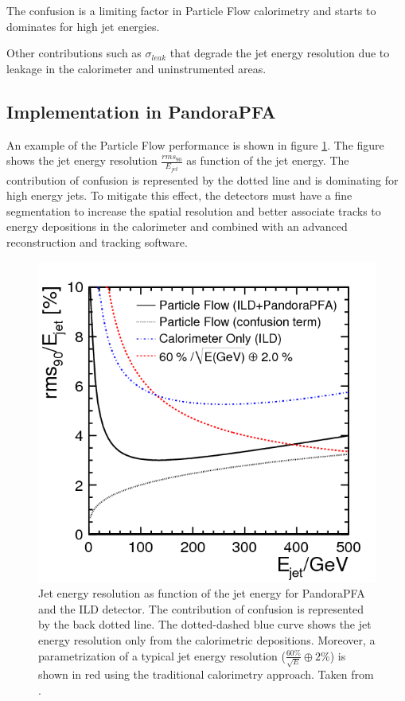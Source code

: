 The confusion is a limiting factor in Particle Flow calorimetry and starts to dominates for high jet energies. 

Other contributions such as $\sigma_{leak}$ that degrade the jet energy resolution due to leakage in the calorimeter and uninstrumented areas.

\subsection{Implementation in PandoraPFA}

\cite{Marshall2013}

An example of the Particle Flow performance is shown in figure \ref{fig:ILDPFA}. The figure shows the jet energy resolution $\frac{rms_{90}}{E_{jet}}$ as function of the jet energy. The contribution of confusion is represented by the dotted line and is dominating for high energy jets. To mitigate this effect, the detectors must have a fine segmentation to increase the spatial resolution and better associate tracks to energy depositions in the calorimeter and combined with an advanced reconstruction and tracking software.

\begin{figure}[htbp!]
  \centering
  \includegraphics[width=0.6\linewidth]{chap2/fig/pfa_figure_10.png}
  \caption{Jet energy resolution as function of the jet energy for PandoraPFA and the ILD detector. The contribution of confusion is represented by the back dotted line. The dotted-dashed blue curve shows the jet energy resolution only from the calorimetric depositions. Moreover, a parametrization of a typical jet energy resolution ($\frac{60\%}{\sqrt{E}} \oplus 2\%$) is shown in red using the traditional calorimetry approach. Taken from \cite{Thomson:2009rp}.} \label{fig:ILDPFA}
\end{figure}
